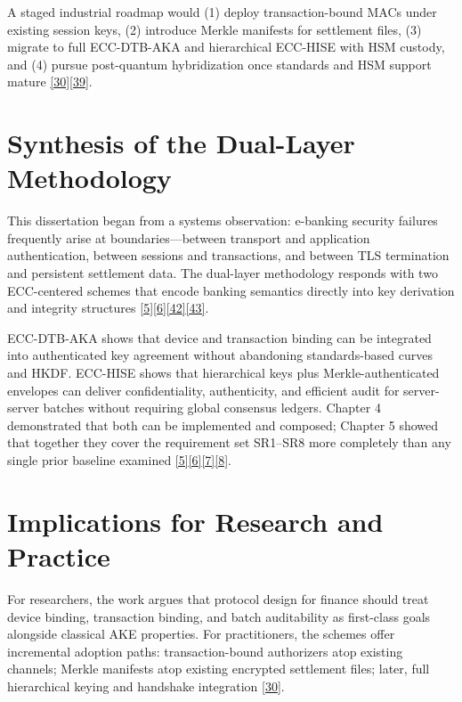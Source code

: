 \indent A staged industrial roadmap would (1) deploy transaction-bound MACs under existing session keys, (2) introduce Merkle manifests for settlement files, (3) migrate to full ECC-DTB-AKA and hierarchical ECC-HISE with HSM custody, and (4) pursue post-quantum hybridization once standards and HSM support mature \hyperref[ref:30]{[30]}\hyperref[ref:39]{[39]}.

\section{Synthesis of the Dual-Layer Methodology}

\indent This dissertation began from a systems observation: e-banking security failures frequently arise at boundaries---between transport and application authentication, between sessions and transactions, and between TLS termination and persistent settlement data. The dual-layer methodology responds with two ECC-centered schemes that encode banking semantics directly into key derivation and integrity structures \hyperref[ref:5]{[5]}\hyperref[ref:6]{[6]}\hyperref[ref:42]{[42]}\hyperref[ref:43]{[43]}.

\indent ECC-DTB-AKA shows that device and transaction binding can be integrated into authenticated key agreement without abandoning standards-based curves and HKDF. ECC-HISE shows that hierarchical keys plus Merkle-authenticated envelopes can deliver confidentiality, authenticity, and efficient audit for server-server batches without requiring global consensus ledgers. Chapter 4 demonstrated that both can be implemented and composed; Chapter 5 showed that together they cover the requirement set SR1--SR8 more completely than any single prior baseline examined \hyperref[ref:5]{[5]}\hyperref[ref:6]{[6]}\hyperref[ref:7]{[7]}\hyperref[ref:8]{[8]}.

\section{Implications for Research and Practice}

\indent For researchers, the work argues that protocol design for finance should treat device binding, transaction binding, and batch auditability as first-class goals alongside classical AKE properties. For practitioners, the schemes offer incremental adoption paths: transaction-bound authorizers atop existing channels; Merkle manifests atop existing encrypted settlement files; later, full hierarchical keying and handshake integration \hyperref[ref:30]{[30]}.

